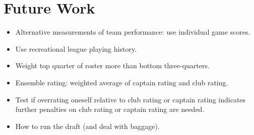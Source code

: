 \section{Future Work}\label{sec:summary}

\begin{itemize}

\item Alternative measurements of team performance: use individual game scores.

\item Use recreational league playing history.

\item Weight top quarter of roster more than bottom three-quarters.

\item Ensemble rating: weighted average of captain rating and club rating.

\item Test if overrating oneself relative to club rating or captain rating indicates further penalties on club rating or captain rating are needed.

\item How to run the draft (and deal with baggage).

\end{itemize}